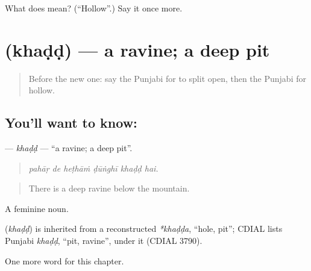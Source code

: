 \begin{tcolorbox}[breakable,colback=teal!4,colframe=teal!35!black,title={Before you move on}]
What does  mean? (\textquotedblleft{}Hollow\textquotedblright{}.) Say it once more.
\end{tcolorbox}
\section[\texorpdfstring{\pa{ਖੱਡ} (khaḍḍ)}{ਖੱਡ (khaḍḍ)}]{ (khaḍḍ) — a ravine; a deep pit}

\label{lesson:PA-C295-khadd}



\begin{quote}
Before the new one: say the Punjabi for to split open, then the Punjabi for hollow.
\end{quote}

\subsection*{You'll want to know: }
\textbf{} — \emph{khaḍḍ} — \textquotedblleft{}a ravine; a deep pit\textquotedblright{}.

\begin{quote}
     
\end{quote}

\begin{quote}
\emph{pahāṛ de heṭhāṁ ḍūṅghī khaḍḍ hai.}
\end{quote}

\begin{quote}
There is a deep ravine below the mountain.
\end{quote}

A feminine noun.

\begin{cousinweb}
\textbf{} (\emph{khaḍḍ}) is inherited from a reconstructed \emph{*khaḍḍa}, \textquotedblleft{}hole, pit\textquotedblright{}; CDIAL lists Punjabi \emph{khaḍḍ}, \textquotedblleft{}pit, ravine\textquotedblright{}, under it (CDIAL 3790).
\end{cousinweb}

\begin{grammarlens}[title={What you've built}]
One more word for this chapter.
\end{grammarlens}

